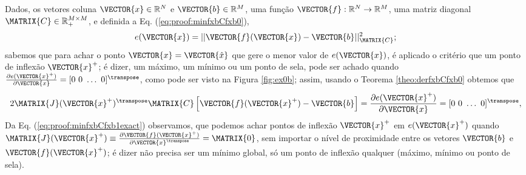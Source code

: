 \begin{myproofT}\label{proof:theo:minfxbCfxb}
Dados,
os vetores coluna $\VECTOR{x}\in \mathbb{R}^N$ e $\VECTOR{b}\in \mathbb{R}^M$,  
uma função $\VECTOR{f}:\mathbb{R}^{N} \rightarrow \mathbb{R}^{M}$, 
uma matriz diagonal $\MATRIX{C} \in \mathbb{R}^{M\times M}_+$, e 
definida a Eq. (\ref{eq:proof:minfxbCfxb0}),
\begin{equation}\label{eq:proof:minfxbCfxb0}
e(\VECTOR{x})=||\VECTOR{f}(\VECTOR{x})-\VECTOR{b}||_{\MATRIX{C}}^2;
\end{equation}
sabemos que para achar o ponto $\VECTOR{x}=\VECTOR{\hat{x}}$ que gere o menor valor de $e(\VECTOR{x})$, é aplicado
o critério que um ponto de inflexão $\VECTOR{x}^+$; é dizer, um máximo, um mínimo ou um ponto de sela, pode ser achado quando 
$\frac{\partial e(\VECTOR{x}^+)}{\partial \VECTOR{x} }=[0~ 0~ \hdots~ 0 ]^{\transpose}$, como pode ser visto na Figura \ref{fig:ex0b};
assim, usando o Teorema \ref{theo:derfxbCfxb0} obtemos que
\begin{equation}\label{eq:proof:minfxbCfxb1exact}
2 \MATRIX{J}(\VECTOR{x}^+)^{\transpose}\MATRIX{C}\left[ \VECTOR{f}(\VECTOR{x}^+)-\VECTOR{b} \right] =
\frac{\partial e(\VECTOR{x}^+)}{\partial \VECTOR{x} }=[0~ 0~ \hdots~ 0 ]^{\transpose},
\end{equation}
Da Eq. (\ref{eq:proof:minfxbCfxb1exact}) observamos, que podemos achar pontos de inflexão $\VECTOR{x}^+$
em $e(\VECTOR{x}^+)$ quando 
$\MATRIX{J}(\VECTOR{x}^+) \equiv \frac{\partial \VECTOR{f}(\VECTOR{x}^+)}{\partial \VECTOR{x}^{\transpose} } = \MATRIX{0}$, 
sem importar o nível de proximidade entre os vetores $\VECTOR{b}$ e $\VECTOR{f}(\VECTOR{x}^+)$;
é dizer não precisa ser um mínimo global, só um ponto de inflexão qualquer
(máximo, mínimo ou ponto de sela).


\end{myproofT}
